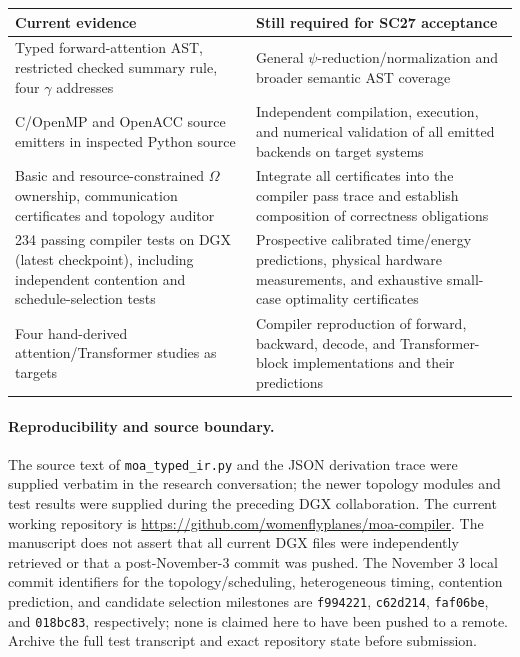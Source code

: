 \documentclass[11pt]{article}
\begin{document}
\begin{center}\small
\begin{tabular}{p{.42\linewidth}p{.48\linewidth}}\toprule
\textbf{Current evidence} & \textbf{Still required for SC27 acceptance}\\\midrule
Typed forward-attention AST, restricted checked summary rule, four $\gamma$
addresses & General $\psi$-reduction/normalization and broader semantic
AST coverage\\
C/OpenMP and OpenACC source emitters in inspected Python source & Independent
compilation, execution, and numerical validation of all emitted backends
on target systems\\
Basic and resource-constrained $\Omega$ ownership, communication certificates
and topology auditor & Integrate all certificates into the compiler pass
trace and establish composition of correctness obligations\\
234 passing compiler tests on DGX (latest checkpoint), including independent
contention and schedule-selection tests & Prospective calibrated time/energy
predictions, physical hardware measurements, and exhaustive small-case optimality certificates\\
Four hand-derived attention/Transformer studies as targets & Compiler
reproduction of forward, backward, decode, and Transformer-block
implementations and their predictions\\\bottomrule
\end{tabular}
\end{center}

\paragraph{Reproducibility and source boundary.}
The source text of \texttt{moa\_typed\_ir.py} and the JSON derivation trace
were supplied verbatim in the research conversation; the newer topology
modules and test results were supplied during the preceding DGX collaboration.
The current working repository is
\url{https://github.com/womenflyplanes/moa-compiler}. The manuscript does not
assert that all current DGX files were independently retrieved or that a
post-November-3 commit was pushed. The November 3 local commit identifiers for the topology/scheduling,
heterogeneous timing, contention prediction, and candidate selection
milestones are \texttt{f994221}, \texttt{c62d214}, \texttt{faf06be},
and \texttt{018bc83}, respectively; none is claimed here to have been
pushed to a remote.
Archive the full test transcript and exact repository state before submission.
\end{document}
